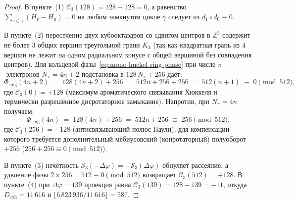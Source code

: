 \begin{proof}
В пункте~(1) $\mathcal{C}_3(128) = 128 - 128 = 0$, а равенство $\sum_{e\in\gamma}(H_v - H_u) = 0$ на любом замкнутом цикле $\gamma$ следует из $d_1\circ d_0 \equiv 0$.

В пункте~(2) пересечение двух кубооктаэдров со сдвигом центров в $\mathbb{Z}^3$ содержит не более $3$ общих вершин треугольной грани $K_3$ (так как квадратная грань из $4$ вершин не лежит на одном радиальном конусе с общей вершиной без совпадения центров). Для кольцевой фазы~\eqref{eq:mono-huckel-ring-phase} при числе $\pi$-электронов $N_\pi = 4n + 2$ подстановка в $128\,N_\pi + 256$ даёт:
\[
  \Phi_{\mathrm{ring}}(4n + 2) \;=\; 128(4n + 2) + 256 \;=\; 512n + 256 + 256 \;=\; 512(n + 1) \;\equiv\; 0 \pmod{512},
\]
где $\mathcal{C}_3(0) = +128$ (максимум ароматического связывания Хюккеля и термически разрешённое дисротаторное замыкание). Напротив, при $N_\pi = 4n$ получаем:
\[
  \Phi_{\mathrm{ring}}(4n) \;=\; 128(4n) + 256 \;=\; 512n + 256 \;\equiv\; 256 \pmod{512},
\]
где $\mathcal{C}_3(256) = -128$ (антисвязывающий полюс Паули), для компенсации которого требуется дополнительный мёбиусовский (конротаторный) полуоборот $+256$ ($256 + 256 \equiv 0 \pmod{512}$).

В пункте~(3) нечётность $\mathcal{S}_3(-\Delta\varphi) = -\mathcal{S}_3(\Delta\varphi)$ обнуляет рассеяние, а удвоение фазы $2\times 256 = 512 \equiv 0 \pmod{512}$ возвращает $\mathcal{C}_3(512) = +128$. В пункте~(4) при $\Delta\varphi = 139$ проекция равна $\mathcal{C}_3(139) = 128 - 139 = -11$, откуда $D_{\mathrm{coh}} = 11\,616$ и $\lfloor 6\,823\,936 / 11\,616 \rfloor = 587$.
\end{proof}

